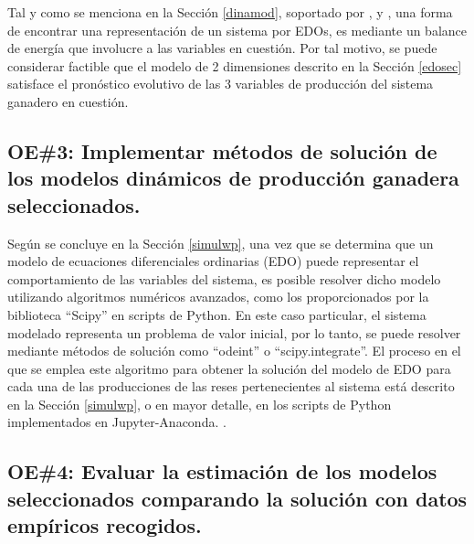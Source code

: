 Tal y como se menciona en la Sección \ref{dinamod}, soportado por \cite{shanks}, \cite{silvestre} y \cite{iran}, una forma de encontrar una representación de un sistema por EDOs, es mediante un balance de energía que involucre a las variables en cuestión. Por tal motivo, se puede considerar factible que el modelo de 2 dimensiones descrito en la Sección \ref{edosec} satisface el pronóstico evolutivo de las 3 variables de producción del sistema ganadero en cuestión.


\subsection{OE\#3: Implementar métodos de solución de los modelos dinámicos de producción ganadera seleccionados.}


Según se concluye en la Sección \ref{simulwp}, una vez que se determina que un modelo de ecuaciones diferenciales ordinarias (EDO) puede representar el comportamiento de las variables del sistema, es posible resolver dicho modelo utilizando algoritmos numéricos avanzados, como los proporcionados por la biblioteca ``Scipy'' en scripts de Python. En este caso particular, el sistema modelado representa un problema de valor inicial, por lo tanto, se puede resolver mediante métodos de solución como ``odeint'' o ``scipy.integrate''. El proceso en el que se emplea este algoritmo para obtener la solución del modelo de EDO para cada una de las producciones de las reses pertenecientes al sistema está descrito en la Sección \ref{simulwp}, o en mayor detalle, en los scripts de Python implementados en Jupyter-Anaconda. \cite{msclfggprogrepo}.


\subsection{OE\#4: Evaluar la estimación de los modelos seleccionados comparando la solución con datos empíricos recogidos.} 

